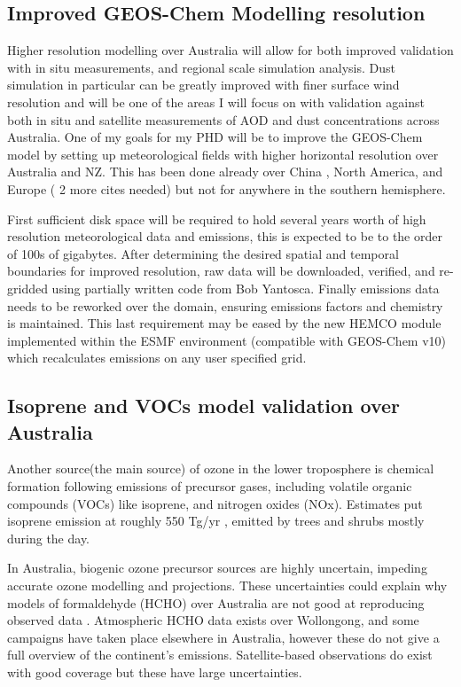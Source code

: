 

\subsection{Improved GEOS-Chem Modelling resolution}
Higher resolution modelling over Australia will allow for both improved validation with in situ measurements, and regional scale simulation analysis. 
Dust simulation in particular can be greatly improved with finer surface wind resolution and will be one of the areas I will focus on with validation against both in situ and satellite measurements of AOD and dust concentrations across Australia.
One of my goals for my PHD will be to improve the GEOS-Chem model by setting up meteorological fields with higher horizontal resolution over Australia and NZ.
This has been done already over China \cite{Chen_2009}, North America, and Europe ( 2 more cites needed) but not for anywhere in the southern hemisphere.

First sufficient disk space will be required to hold several years worth of high resolution meteorological data and emissions, this is expected to be to the order of 100s of gigabytes.
After determining the desired spatial and temporal boundaries for improved resolution, raw data will be downloaded, verified, and re-gridded using partially written code from Bob Yantosca.
Finally emissions data needs to be reworked over the domain, ensuring emissions factors and chemistry is maintained.
This last requirement may be eased by the new HEMCO module implemented within the ESMF environment (compatible with GEOS-Chem v10) which recalculates emissions on any user specified grid.


\subsection{Isoprene and VOCs model validation over Australia}
Another source(the main source) of ozone in the lower troposphere is chemical formation following emissions of precursor gases, including volatile organic compounds (VOCs) like isoprene, and nitrogen oxides (NOx).
Estimates put isoprene emission at roughly 550 Tg/yr \cite{Guenther_2006, Monks_2014}, emitted by trees and shrubs mostly during the day.

In Australia, biogenic ozone precursor sources are highly uncertain, impeding accurate ozone modelling and projections. These uncertainties could explain why models of formaldehyde (HCHO) over Australia are not good at reproducing observed data \cite{Stavrakou_2009}. Atmospheric HCHO data exists over Wollongong, and some campaigns have taken place elsewhere in Australia, however these do not give a full overview of the continent's emissions. Satellite-based observations do exist with good coverage but these have large uncertainties. 

